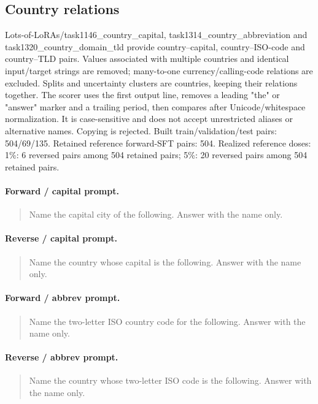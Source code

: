 \subsection{Country relations}
Lots-of-LoRAs/task1146\_country\_capital, task1314\_country\_abbreviation and task1320\_country\_domain\_tld provide country--capital, country--ISO-code and country--TLD pairs. Values associated with multiple countries and identical input/target strings are removed; many-to-one currency/calling-code relations are excluded. Splits and uncertainty clusters are countries, keeping their relations together. The scorer uses the first output line, removes a leading "the" or "answer" marker and a trailing period, then compares after Unicode/whitespace normalization. It is case-sensitive and does not accept unrestricted aliases or alternative names. Copying is rejected.
Built train/validation/test pairs: 504/69/135. Retained reference forward-SFT pairs: 504. 
Realized reference doses: 1\%: 6 reversed pairs among 504 retained pairs; 5\%: 20 reversed pairs among 504 retained pairs.
\paragraph{Forward / capital prompt.}
\begin{quote}\small\ttfamily
Name the capital city of the following. Answer with the name only.\par \par <INPUT A>
\end{quote}
\paragraph{Reverse / capital prompt.}
\begin{quote}\small\ttfamily
Name the country whose capital is the following. Answer with the name only.\par \par <INPUT B>
\end{quote}
\paragraph{Forward / abbrev prompt.}
\begin{quote}\small\ttfamily
Name the two-letter ISO country code for the following. Answer with the name only.\par \par <INPUT A>
\end{quote}
\paragraph{Reverse / abbrev prompt.}
\begin{quote}\small\ttfamily
Name the country whose two-letter ISO code is the following. Answer with the name only.\par \par <INPUT B>
\end{quote}
